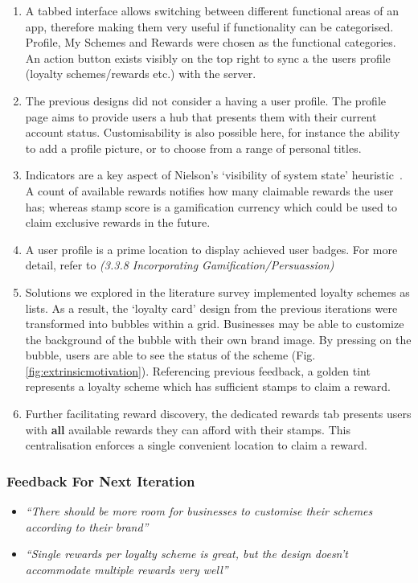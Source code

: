 \begin{enumerate}
  \item A tabbed interface allows switching between different functional areas of an app, therefore making them very useful if functionality can be categorised. Profile, My Schemes and Rewards were chosen as the functional categories. An action button exists visibly on the top right to sync a the users profile (loyalty schemes/rewards etc.) with the server.
  \item The previous designs did not consider a having a user profile. The profile page aims to provide users a hub that presents them with their current account status. Customisability is also possible here, for instance the ability to add a profile picture, or to choose from a range of personal titles.
  \item Indicators are a key aspect of Nielson's `visibility of system state' heuristic~\cite{jakob}. A count of available rewards notifies how many claimable rewards the user has; whereas stamp score is a gamification currency which could be used to claim exclusive rewards in the future. 
  \item A user profile is a prime location to display achieved user badges. For more detail, refer to \textit{(3.3.8 Incorporating Gamification/Persuassion)}
  \item Solutions we explored in the literature survey implemented loyalty schemes as lists. As a result, the `loyalty card' design from the previous iterations were transformed into bubbles within a grid. Businesses may be able to customize the background of the bubble with their own brand image. By pressing on the bubble, users are able to see the status of the scheme (Fig. \ref{fig:extrinsicmotivation}). Referencing previous feedback, a golden tint represents a loyalty scheme which has sufficient stamps to claim a reward.
  \item Further facilitating reward discovery, the dedicated rewards tab presents users with \textbf{all} available rewards they can afford with their stamps. This centralisation enforces a single convenient location to claim a reward. 
\end{enumerate}

\subsubsection{Feedback For Next Iteration}
\begin{itemize}
  \item \textit{``There should be more room for businesses to customise their schemes according to their brand''}
  \item \textit{``Single rewards per loyalty scheme is great, but the design doesn't accommodate multiple rewards very well''}
\end{itemize}

